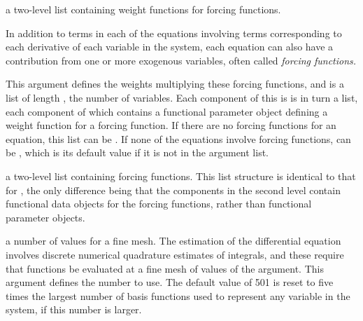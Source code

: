 \documentclass{article}
\begin{document}
\begin{Arguments}
\begin{ldescription}
\item[\code{awtlist}] a two-level list containing weight functions for forcing functions.

In addition to terms in each of the equations involving terms corresponding
to each derivative of each variable in the system, each equation can
also have a contribution from one or more exogenous variables, often
called \emph{forcing functions.}

This argument defines the weights multiplying these
forcing functions, and is a list of length , the number of variables.
Each component of this is is in turn a list, each component of which contains
a functional parameter object defining a weight function for a forcing function.
If there are no forcing functions for an equation, this list can be .
If none of the equations involve forcing functions,  can be
, which is its default value if it is not in the argument list.

\item[\code{ufdlist}] a two-level list containing forcing functions.  This list structure is 
identical to that for , the only difference being that the
components in the second level contain functional data objects for the 
forcing functions, rather than functional parameter objects.

\item[\code{nfine}] a number of values for a fine mesh.
The estimation of the differential equation involves discrete
numerical quadrature estimates of integrals, and these require
that functions be evaluated at a fine mesh of values of the
argument.  This argument defines the number to use.  The default value of 501
is reset to five times the largest number of basis functions used to represent 
any variable in the system, if this number is larger.

\end{ldescription}
\end{Arguments}
\end{document}
